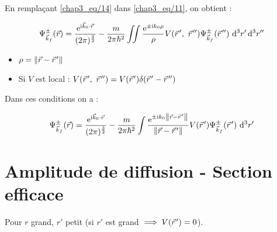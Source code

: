 \documentclass[12pt,a4paper,oneside,french]{book}
\renewcommand{\i}{\mathrm{i}}
\newcommand{\e}{\mathrm{e}}
\newcommand{\diff}{\mathrm{d}}
\newcommand{\pvec}[1]{\vec{#1} \mkern2mu \vphantom{#1}}
\theoremstyle{definition}
\theoremstyle{definition}
\theoremstyle{definition}
\theoremstyle{remark}
\theoremstyle{definition}
\begin{document}
    En remplaçant \eqref{chap3_eq/14} dans \eqref{chap3_eq/11}, on obtient :
    
    \begin{equation*}
        {\Psi}_{{\vec{k}}_{f}}^{\pm}(\vec{r}) = \frac{{\e}^{\i {\vec{k}}_{0} \cdot \vec{r}}}{(2\pi)^{\frac{3}{2}}} - \frac{m}{2\pi {\hbar}^{2}} \iint \frac{{\e}^{\pm\i {k}_{0} \rho}}{\rho} V(\pvec{r}', \ \pvec{r}'') {\Psi}_{{\vec{k}}_{f}}^{\pm}(\pvec{r}'') \ {\diff}^{3} r' \, {\diff}^{3} r''
    \end{equation*}
    
    \begin{itemize}
        \item
        $\rho = \left\lVert\vec{r} - \pvec{r}'\right\rVert$
        
        \item
        Si $V$ est local : $V(\pvec{r}', \ \pvec{r}'') = V(\pvec{r}') \delta(\pvec{r}' - \pvec{r}'')$
    \end{itemize}
    
    \bigskip
    
    Dans ces conditions on a :
    
     \begin{equation} \label{chap3_eq/15}
        {\Psi}_{{\vec{k}}_{f}}^{\pm}(\vec{r}) = \frac{{\e}^{\i {\vec{k}}_{0} \cdot \vec{r}}}{(2\pi)^{\frac{3}{2}}} - \frac{m}{2\pi {\hbar}^{2}} \int \frac{{\e}^{\pm\i {k}_{0} \left\lVert\vec{r} - \pvec{r}'\right\rVert}}{\left\lVert\vec{r} - \pvec{r}'\right\rVert} V(\pvec{r}') {\Psi}_{{\vec{k}}_{f}}^{\pm}(\pvec{r}') \ {\diff}^{3} r'
    \end{equation}
    
    
    \section{Amplitude de diffusion - Section efficace}
    Pour $r$ grand, $r'$ petit (si $r'$ est grand $\implies V(\pvec{r}') = 0$).
    
\end{document}
